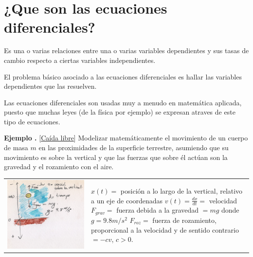 \documentclass{article}
\newcounter{ejemplo_cont}
\newenvironment{ejemplo}{\noindent\textbf{Ejemplo  \arabic{ejemplo_cont}.} }{\addtocounter{ejemplo_cont}{1}}
\begin{document}
\section{¿Que son las ecuaciones diferenciales?}


\begin{definicion}
 Es una o varias relaciones entre una o varias variables dependientes y sus tasas de cambio respecto a ciertas variables independientes.
 \end{definicion}

 El problema básico asociado
 a las ecuaciones diferenciales es hallar las variables dependientes que las resuelven.

 Las ecuaciones diferenciales son usadas muy a menudo en matemática aplicada, puesto que muchas
 leyes (de la física por ejemplo) se expresan atraves de este tipo de ecuaciones.








 \begin{ejemplo}[\href{http://es.wikipedia.org/wiki/Caída_libre}{Caída libre}] Modelizar matemáticamente el movimiento de un cuerpo de masa $m$ en las proximidades de la superficie
terrestre, asumiendo que su movimiento es
sobre la vertical y que las fuerzas que sobre él actúan son la gravedad y el rozamiento con el aire.
\end{ejemplo}
 \begin{tabular}{m{4.5cm} m{5cm}} \includegraphics[scale=0.07]{imagenes/caida_libre.jpg}    &  $x(t)=$ posición a lo largo de la vertical, relativo a un eje de coordenadas\newline
$v(t)=\frac{dx}{dt}=$ velocidad\newline
$F_{grav}=$ fuerza debida a la gravedad $=mg$ donde $g=9.8m/s^2$
$F_{roz}=$ fuerza de rozamiento, proporcional a la velocidad y de sentido contrario $=-cv$, $c>0$.

\end{tabular}
\end{document}

